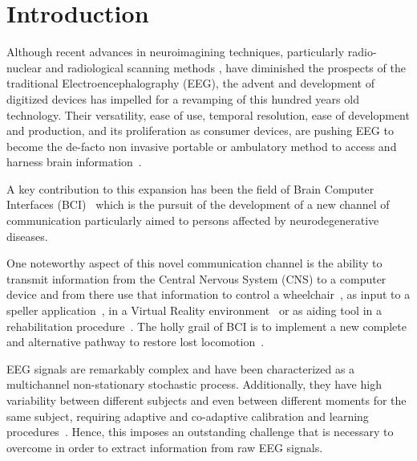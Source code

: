 \documentclass[utf8]{frontiersSCNS} %
\begin{document}
\section{Introduction}

Although recent advances in neuroimagining techniques, particularly radio-nuclear and radiological scanning methods \citep{Schomer2010}, have diminished the prospects of the traditional Electroencephalography (EEG), the advent and development of digitized devices has impelled for a revamping of this hundred years old technology.  Their versatility, ease of use, temporal resolution, ease of development and production, and its proliferation as consumer devices, are pushing EEG to become the de-facto non invasive portable or ambulatory method to access and harness brain information~\citep{DeVos2014}.

A key contribution to this expansion has been the field of Brain Computer Interfaces (BCI)~\citep{WolpawJonathanR2012} which is the pursuit of the development of a new channel of communication particularly aimed to persons affected by neurodegenerative diseases.

One noteworthy aspect of this novel communication channel is the ability to transmit information from the Central Nervous System (CNS) to a computer device and from there use that information to control a wheelchair~\citep{Carlson2013}, as input to a speller application~\citep{Guger2009a}, in a Virtual Reality environment~\citep{Lotte2013} or as aiding tool in a rehabilitation procedure~\citep{Jure2016}.  The holly grail of BCI is to implement a new complete and alternative pathway to restore lost locomotion~\citep{WolpawJonathanR2012}.

EEG signals are remarkably complex and have been characterized as a multichannel non-stationary stochastic process.  Additionally, they have high variability between different subjects and even between different moments for the same subject, requiring adaptive and co-adaptive calibration and learning procedures~\citep{Clerc}.  Hence, this imposes an outstanding challenge that is necessary to overcome in order to extract information from raw EEG signals.

\end{document}
